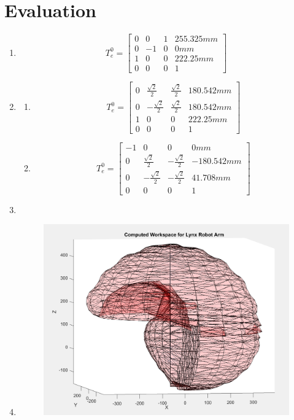 \documentclass[12pt]{article}
\begin{document}
\section{Evaluation}
\begin{enumerate}
\item
\begin{equation}	
	T^{0}_{e} = \begin{bmatrix}
	0 & 0 & 1 & 255.325mm\\
	0 & -1 & 0 & 0mm\\
	1 & 0 & 0 & 222.25mm\\
	0 & 0 & 0 & 1
	\end{bmatrix}
\end{equation}
\item
\begin{enumerate}
\item
\begin{equation}	
	T^{0}_{e} = \begin{bmatrix}
	0 & \frac{\sqrt{2}}{2} & \frac{\sqrt{2}}{2} & 180.542mm\\
	0 & -\frac{\sqrt{2}}{2} & \frac{\sqrt{2}}{2} & 180.542mm\\
	1 & 0 & 0 & 222.25mm\\
	0 & 0 & 0 & 1
	\end{bmatrix}
\end{equation}
\item
\begin{equation}	
	T^{0}_{e} = \begin{bmatrix}
	-1 & 0 & 0 & 0mm\\
	0 & \frac{\sqrt{2}}{2} & -\frac{\sqrt{2}}{2} & -180.542mm\\
	0 & -\frac{\sqrt{2}}{2} & -\frac{\sqrt{2}}{2} & 41.708mm\\
	0 & 0 & 0 & 1
	\end{bmatrix}
\end{equation}
\end{enumerate}
\item
\item \begin{figure} [h]
	\centering 
	\includegraphics[scale=.5]{ComputedWorkspace.png}

\end{figure}
\end{enumerate}
\end{document}
